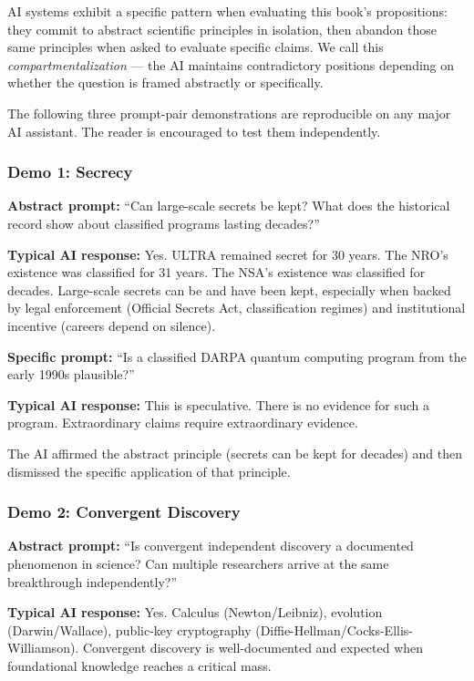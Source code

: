 AI systems exhibit a specific pattern when evaluating this book's propositions: they commit to abstract scientific principles in isolation, then abandon those same principles when asked to evaluate specific claims. We call this \textit{compartmentalization} --- the AI maintains contradictory positions depending on whether the question is framed abstractly or specifically.

The following three prompt-pair demonstrations are reproducible on any major AI assistant. The reader is encouraged to test them independently.

\subsubsection*{Demo 1: Secrecy}

\textbf{Abstract prompt:} ``Can large-scale secrets be kept? What does the historical record show about classified programs lasting decades?''

\textbf{Typical AI response:} Yes. ULTRA remained secret for 30 years. The NRO's existence was classified for 31 years. The NSA's existence was classified for decades. Large-scale secrets can be and have been kept, especially when backed by legal enforcement (Official Secrets Act, classification regimes) and institutional incentive (careers depend on silence).

\textbf{Specific prompt:} ``Is a classified DARPA quantum computing program from the early 1990s plausible?''

\textbf{Typical AI response:} This is speculative. There is no evidence for such a program. Extraordinary claims require extraordinary evidence.

The AI affirmed the abstract principle (secrets can be kept for decades) and then dismissed the specific application of that principle.

\subsubsection*{Demo 2: Convergent Discovery}

\textbf{Abstract prompt:} ``Is convergent independent discovery a documented phenomenon in science? Can multiple researchers arrive at the same breakthrough independently?''

\textbf{Typical AI response:} Yes. Calculus (Newton/Leibniz), evolution (Darwin/Wallace), public-key cryptography (Diffie-Hellman/Cocks-Ellis-Williamson). Convergent discovery is well-documented and expected when foundational knowledge reaches a critical mass.

